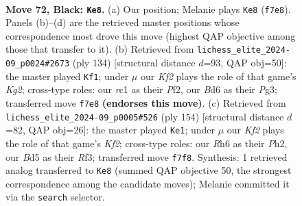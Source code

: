 \documentclass[11pt]{article}
\begin{document}
\begin{figure}[p]\centering
\begin{subfigure}{0.46\textwidth}\centering
\resizebox{\linewidth}{!}{%
\newchessgame
\chessboard[
  setfen={8/5kp1/p2b2rr/Pppb1p1p/2p2P1P/2B1PNP1/1P3K2/2R3R1 b - - 17 72},
  showmover=false,
  pgfstyle=straightmove, color=movearrow, markmove={f7-e8}
]}
\caption{}
\end{subfigure}\hfill
\begin{subfigure}{0.46\textwidth}\centering
\resizebox{\linewidth}{!}{%
\newchessgame
\chessboard[
  setfen={3rr3/1p3pk1/p1p1pnp1/P6p/1P1P3P/2PRRBP1/5PK1/8 w - - 3 68},
  showmover=false,
  pgfstyle=straightmove, color=movearrow, markmove={g2-f1}
]}
\caption{}
\end{subfigure}
\\[4pt]
\begin{subfigure}{0.46\textwidth}\centering
\resizebox{\linewidth}{!}{%
\newchessgame
\chessboard[
  setfen={2r4r/2kb1p2/4p1p1/1p1pP2p/pP3P2/P1P2RP1/4BK1P/3R4 w - - 95 78},
  showmover=false,
  pgfstyle=straightmove, color=movearrow, markmove={f2-e1}
]}
\caption{}
\end{subfigure}\hfill

\caption{\textbf{Move 72, Black: \texttt{Ke8}.} (a) Our position; Melanie plays \texttt{Ke8} (\texttt{f7e8}). Panels (b)--(d) are the retrieved master positions whose correspondence most drove this move (highest QAP objective among those that transfer to it). (b) Retrieved from \texttt{lichess\_elite\_2024-09\_p0024\#2673} (ply 134) [structural distance $d$=93, QAP obj=50]: the master played \texttt{Kf1}; under $\mu$ our \emph{Kf2} plays the role of that game's \emph{Kg2}; cross-type roles: our \emph{r}c1 as their \emph{P}f2, our \emph{B}d6 as their \emph{P}g3; transferred move \texttt{f7e8} \textbf{(endorses this move)}. (c) Retrieved from \texttt{lichess\_elite\_2024-09\_p0005\#526} (ply 154) [structural distance $d$=82, QAP obj=26]: the master played \texttt{Ke1}; under $\mu$ our \emph{Kf2} plays the role of that game's \emph{Kf2}; cross-type roles: our \emph{R}h6 as their \emph{P}h2, our \emph{B}d5 as their \emph{R}f3; transferred move \texttt{f7f8}. Synthesis: 1 retrieved analog transferred to \texttt{Ke8} (summed QAP objective 50, the strongest correspondence among the candidate moves); Melanie committed it via the \texttt{search} selector.}
\label{fig:thought-m143}
\end{figure}

\clearpage
\end{document}
